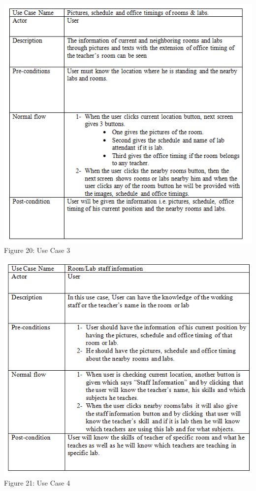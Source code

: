 \documentclass{article}
\begin{document}
\begin{center}
\includegraphics[scale=0.8]{uc3}
\\Figure 20: Use Case 3
\end{center}
\begin{center}
\includegraphics[scale=0.7]{uc4}
\\Figure 21: Use Case 4
\end{center}
\end{document}
